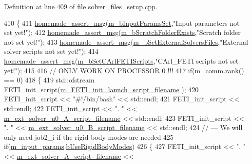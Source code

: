 Definition at line 409 of file solver\+\_\+files\+\_\+setup.\+cpp.


\begin{DoxyCode}
410 \{
411     \hyperlink{common__header_8h_a593ccc80b790b2268653fcf6597bf451}{homemade\_assert\_msg}(\hyperlink{classcarl_1_1_solver___files___setup_a7187af3c4a90be2d8ad2a25c11c0e910}{m\_bInputParamsSet},\textcolor{stringliteral}{"Input parameters not set
       yet!"});
412     \hyperlink{common__header_8h_a593ccc80b790b2268653fcf6597bf451}{homemade\_assert\_msg}(\hyperlink{classcarl_1_1_solver___files___setup_ac59627eab870e65887560595d0fbc025}{m\_bScratchFolderExists},\textcolor{stringliteral}{"Scratch folder not
       set yet!"});
413     \hyperlink{common__header_8h_a593ccc80b790b2268653fcf6597bf451}{homemade\_assert\_msg}(\hyperlink{classcarl_1_1_solver___files___setup_ad93c68f661273a66d319906dbfe080b5}{m\_bSetExternalSolversFiles},\textcolor{stringliteral}{"External
       solver scripts not set yet!"});
414     \hyperlink{common__header_8h_a593ccc80b790b2268653fcf6597bf451}{homemade\_assert\_msg}(\hyperlink{classcarl_1_1_solver___files___setup_a53cf1256ea7a5f375a887d91ddd2ec9a}{m\_bSetCArlFETIScripts},\textcolor{stringliteral}{"CArl\_FETI scripts
       not set yet!"});
415 
416     \textcolor{comment}{// ONLY WORK ON PROCESSOR 0 !!!}
417     \textcolor{keywordflow}{if}(\hyperlink{classcarl_1_1_solver___files___setup_aa8049195d5e383a0ca4295795e3f5751}{m\_comm}.rank() == 0)
418     \{
419         std::ofstream FETI\_init\_script(\hyperlink{classcarl_1_1_solver___files___setup_a2d9e182d84170579a5f605319258360f}{m\_FETI\_init\_launch\_script\_filename}
      );
420         FETI\_init\_script << \textcolor{stringliteral}{"#!/bin/bash"} << std::endl;
421         FETI\_init\_script << std::endl;
422         FETI\_init\_script << \textcolor{stringliteral}{". "} << \hyperlink{classcarl_1_1_solver___files___setup_ac870acbdb942520edc49f0935605dd0b}{m\_ext\_solver\_u0\_A\_script\_filename} << 
      std::endl;
423         FETI\_init\_script << \textcolor{stringliteral}{". "} << \hyperlink{classcarl_1_1_solver___files___setup_a890a41a7fb4b1130eb9fe558a9509af2}{m\_ext\_solver\_u0\_B\_script\_filename} << 
      std::endl;
424         \textcolor{comment}{// --- We will only need job2\_i if the rigid body modes are needed}
425         \textcolor{keywordflow}{if}(\hyperlink{classcarl_1_1_solver___files___setup_aa5804bf6c6e506b382766333f232d3d5}{m\_input\_params}.\hyperlink{structcarl_1_1feti__setup__init__params_af4191df4632d21bed2b302c08d113d14}{bUseRigidBodyModes})
426         \{
427             FETI\_init\_script << \textcolor{stringliteral}{". "} << \hyperlink{classcarl_1_1_solver___files___setup_a181a314159810779c3c443082ae93563}{m\_ext\_solver\_A\_script\_filename} << 

\end{DoxyCode}

